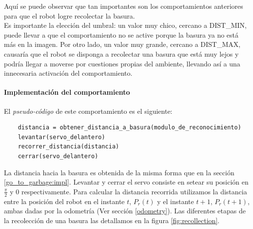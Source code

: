 Aqu\'i se puede observar que tan importantes son los comportamientos anteriores
para que el robot logre recolectar la basura.
\\\indent
Es importante la elecci\'on del umbral: un valor muy chico, cercano a DIST\_MIN,
puede llevar a que el comportamiento no se active porque la basura ya no est\'a
m\'as en la imagen. Por otro lado, un valor muy grande, cercano a DIST\_MAX, 
causar\'ia que el robot se disponga a recolectar una basura que est\'a muy lejos
y podr\'ia llegar a moverse por cuestiones propias del ambiente, llevando as\'i
a una innecesaria activaci\'on del comportamiento.

\paragraph{Implementaci\'on del comportamiento}
El \emph{pseudo-c\'odigo} de este comportamiento es el siguiente:

\begin{verbatim}
    distancia = obtener_distancia_a_basura(modulo_de_reconocimiento)
    levantar(servo_delantero)
    recorrer_distancia(distancia)
    cerrar(servo_delantero)
\end{verbatim}

La distancia hacia la basura es obtenida de la misma forma que en la secci\'on
\ref{go_to_garbage:impl}. Levantar y cerrar el servo consiste en setear su
posici\'on en $\frac{\pi}{2}$ y $0$ respectivamente. Para calcular la distancia
recorrida utilizamos la distancia entre la posici\'on del robot en el
instante $t$, $P_r(t)$ y el instante $t+1$, $P_r(t+1)$, ambas dadas por la
odometr\'ia (Ver secci\'on \ref{odometry}). Las diferentes etapas de la
recolecci\'on de una basura las detallamos en la figura \ref{fig:recollection}.


